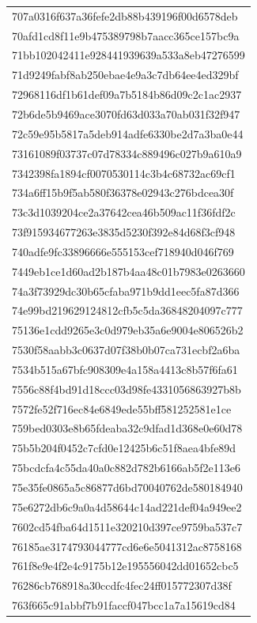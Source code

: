 \begin{tabular}{l}
707a0316f637a36fefe2db88b439196f00d6578deb \\
70afd1cd8f11e9b475389798b7aacc365ce157bc9a \\
71bb102042411e928441939639a533a8eb47276599 \\
71d9249fabf8ab250ebae4e9a3c7db64ee4ed329bf \\
72968116df1b61def09a7b5184b86d09c2c1ac2937 \\
72b6de5b9469ace3070fd63d033a70ab031f32f947 \\
72c59e95b5817a5deb914adfe6330be2d7a3ba0e44 \\
73161089f03737c07d78334c889496c027b9a610a9 \\
7342398fa1894cf0070530114c3b4c68732ac69cf1 \\
734a6ff15b9f5ab580f36378e02943c276bdcea30f \\
73c3d1039204ce2a37642cea46b509ac11f36fdf2c \\
73f915934677263e3835d5230f392e84d68f3cf948 \\
740adfe9fc33896666e555153cef718940d046f769 \\
7449eb1ce1d60ad2b187b4aa48c01b7983e0263660 \\
74a3f73929dc30b65cfaba971b9dd1eec5fa87d366 \\
74e99bd219629124812cfb5c5da36848204097c777 \\
75136e1cdd9265e3c0d979eb35a6e9004e806526b2 \\
7530f58aabb3c0637d07f38b0b07ca731ecbf2a6ba \\
7534b515a67bfc908309e4a158a4413c8b57f6fa61 \\
7556c88f4bd91d18ccc03d98fe4331056863927b8b \\
7572fe52f716ec84e6849ede55bff581252581e1ce \\
759bed0303e8b65fdeaba32c9dfad1d368e0e60d78 \\
75b5b204f0452c7cfd0e12425b6c51f8aea4bfe89d \\
75bcdcfa4c55da40a0c882d782b6166ab5f2e113e6 \\
75e35fe0865a5c86877d6bd70040762de580184940 \\
75e6272db6c9a0a4d58644c14ad221def04a949ee2 \\
7602cd54fba64d1511e320210d397ce9759ba537c7 \\
76185ae3174793044777cd6e6e5041312ac8758168 \\
761f8e9e4f2e4c9175b12e195556042dd01652cbc5 \\
76286cb768918a30ccdfc4fec24ff015772307d38f \\
763f665c91abbf7b91faccf047bcc1a7a15619cd84 \\

\end{tabular}
